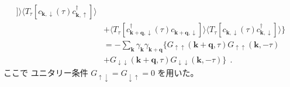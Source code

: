 \documentclass[a4j]{jsarticle}
\begin{document}
\begin{align}
		] \rangle
	\langle T_{\tau} [
			c_{ \bm{k} , \downarrow } (\tau)
			c_{ \bm{k} , \uparrow }^{\dagger}
		] \rangle
	\nonumber \\[2mm] &
	+
	\langle T_{\tau} [
			c_{ \bm{k}+\bm{q} , \downarrow }^{\dagger} (\tau)
			c_{ \bm{k}+\bm{q} , \downarrow }
		] \rangle
	\langle T_{\tau} [
			c_{ \bm{k} , \downarrow } (\tau)
			c_{ \bm{k} , \downarrow }^{\dagger}
		] \rangle
	\Big\}
	\nonumber \\[3mm]
	 & =
	-
	\sum_{ \bm{k} }
	\gamma_{\bm{k}}
	\gamma_{\bm{k}+\bm{q}}
	\Big\{
	G_{\uparrow \uparrow}( \bm{k}+\bm{q} , \tau)
	G_{\uparrow \uparrow}( \bm{k} , - \tau)
	\nonumber \\[-1mm] &
	+
	G_{\downarrow \downarrow}( \bm{k}+\bm{q} , \tau)
	G_{\downarrow \downarrow}( \bm{k} , - \tau)
	\Big\}
	\ \ .
\end{align}
ここで
ユニタリー条件
$G_{\uparrow \downarrow} = G_{\downarrow \uparrow} = 0$
を用いた。
\end{document}
